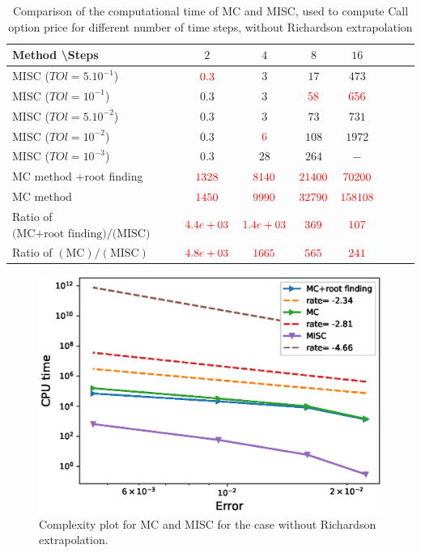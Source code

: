 \documentclass[11pt]{article}
\begin{document}
\begin{table}[h!]
	\centering
	\begin{tabular}{l*{6}{c}r}
		Method \textbackslash  Steps            & $2$ & $4$ & $8$ & $16$ &   \\
		\hline
		MISC ($TOl=5.10^{-1}$) & ${\color{red}0.3}$ & $3$ & $17$ & $473$  \\
		MISC ($TOl=10^{-1}$)  & $0.3$ & $3$ & ${\color{red}58}$ & ${\color{red}656}$  \\
		MISC ($TOl=5.10^{-2}$)   & $0.3$ & $3$ & $73$ & $731$  \\
		MISC ($TOl=10^{-2}$)  & $0.3$ & ${\color{red}6}$ & $108$ & $1972$  \\
		MISC ($TOl=10^{-3}$)   & $0.3$ & $28$ & $264$ & $-$  \\
		\hline
			MC method +root finding   & ${\color{red}1328}$ & ${\color{red}8140}$ & ${\color{red}21400}$ & ${\color{red}70200}$  \\
				MC method & ${\color{red}1450}$ & ${\color{red}9990}$ & ${\color{red}32790}$ & ${\color{red} 158108
				}$  \\
		\hline
		
			Ratio of	$\text{(MC+root finding)}/\text{(MISC)}$ & ${\color{red} 4.4e+03}$ & ${\color{red}   1.4e+03}$ & ${\color{red}369}$ & ${\color{red} 107}$  \\
		Ratio of	$(\text{MC})/(\text{MISC})$ & ${\color{red} 4.8e+03}$ & ${\color{red} 1665}$ & ${\color{red} 565}$ & ${\color{red} 241}$  \\
		\hline
	\end{tabular}
	\caption{Comparison of the computational time of  MC and MISC, used to compute Call option price  for different number of time steps, without Richardson extrapolation}
	\label{Comparsion of the computational time of  MC and MISC, used to compute Call option price  for different number of time steps, without Richardson extrapolation}
\end{table}




	\begin{figure}[h!]
\centering
\includegraphics[width=0.7\linewidth]{./figures/Call_Complexity_rates/error_vs_time}

\caption{Complexity plot for MC and MISC for the case without Richardson extrapolation.}
\label{fig:Complexity plot for MC and MISC , Call non rich}
\end{figure}
\end{document}
